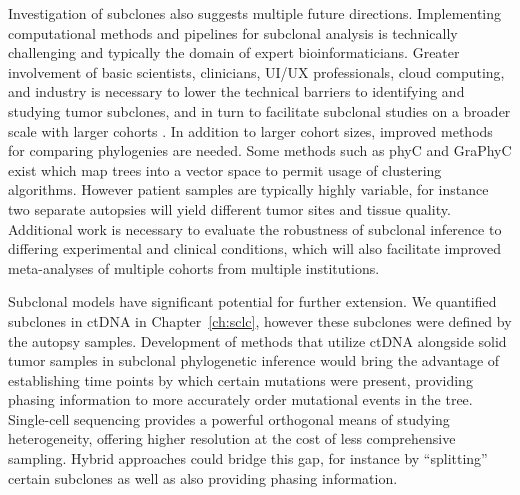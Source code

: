 Investigation of subclones also suggests multiple future directions. Implementing computational methods and pipelines for subclonal analysis is technically challenging \cite{tarabichi2021} and typically the domain of expert bioinformaticians. Greater involvement of basic scientists, clinicians, UI/UX professionals, cloud computing, and industry is necessary to lower the technical barriers to identifying and studying tumor subclones, and in turn to facilitate subclonal studies on a broader scale with larger cohorts \cite{wang2019}. In addition to larger cohort sizes, improved methods for comparing phylogenies are needed. Some methods such as phyC \cite{matsui2017} and GraPhyC \cite{govek2018} exist which map trees into a vector space to permit usage of clustering algorithms. However patient samples are typically highly variable, for instance two separate autopsies will yield different tumor sites and tissue quality. Additional work is necessary to evaluate the robustness of subclonal inference to differing experimental and clinical conditions, which will also facilitate improved meta-analyses of multiple cohorts from multiple institutions.

Subclonal models have significant potential for further extension. We quantified subclones in ctDNA in Chapter~\ref{ch:sclc}, however these subclones were defined by the autopsy samples. Development of methods that utilize ctDNA alongside solid tumor samples in subclonal phylogenetic inference would bring the advantage of establishing time points by which certain mutations were present, providing phasing information to more accurately order mutational events in the tree. Single-cell sequencing \cite{navin2011} provides a powerful orthogonal means of studying heterogeneity, offering higher resolution at the cost of less comprehensive sampling. Hybrid approaches could bridge this gap, for instance by ``splitting'' certain subclones as well as also providing phasing information.

